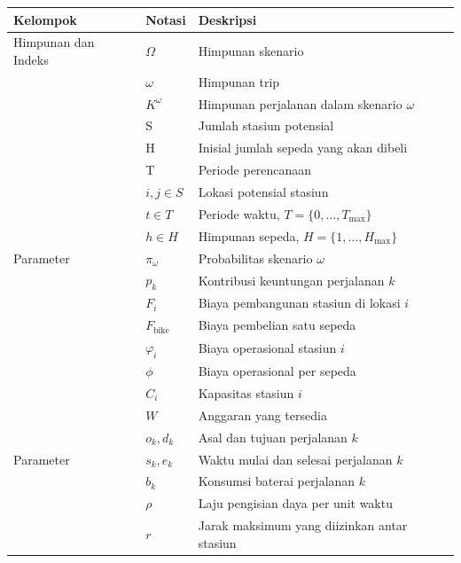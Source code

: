 \begin{table}[H]
\centering
\begin{tabular}{@{}p{}p{}p{}@{}}
\toprule
Kelompok & Notasi & Deskripsi \\
\midrule
Himpunan dan Indeks & $\Omega$ & Himpunan skenario \\
&$\omega$&Himpunan trip\\
&$K^\omega$ & Himpunan perjalanan dalam skenario $\omega$ \\
& S & Jumlah stasiun potensial\\
& H & Inisial jumlah sepeda yang akan dibeli \\
& T & Periode perencanaan \\
& $i, j \in S$ & Lokasi potensial stasiun \\
& $t \in T$ & Periode waktu, $T = \{0, \ldots, T_{\text{max}}\}$ \\
& $h \in H$ & Himpunan sepeda, $H = \{1, \ldots, H_{\text{max}}\}$ \\
\midrule
Parameter & $\pi_\omega$ & Probabilitas skenario $\omega$ \\
& $p_k$ & Kontribusi keuntungan perjalanan $k$ \\
& $F_i$ & Biaya pembangunan stasiun di lokasi $i$ \\
& $F_{\text{bike}}$ & Biaya pembelian satu sepeda \\
& $\varphi_i$ & Biaya operasional stasiun $i$ \\
& $\phi$ & Biaya operasional per sepeda \\
& $C_i$ & Kapasitas stasiun $i$ \\
& $W$ & Anggaran yang tersedia \\
& $o_k, d_k$ & Asal dan tujuan perjalanan $k$ \\
\midrule
Parameter & $s_k, e_k$ & Waktu mulai dan selesai perjalanan $k$ \\
& $b_k$ & Konsumsi baterai perjalanan $k$ \\
& $\rho$ & Laju pengisian daya per unit waktu \\
& $r$ & Jarak maksimum yang diizinkan antar stasiun \\
\bottomrule
\end{tabular}
\end{table}

